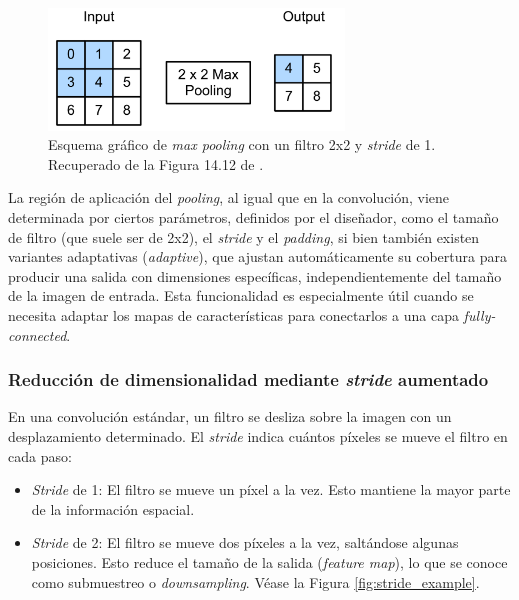 \begin{figure}[h]
    \centering
    \includegraphics[width=0.7\textwidth]{capitulos/cap_02/imagenes/max_pooling.png}
    \caption{
        Esquema gráfico de \textit{max pooling} con un filtro 2x2 y \textit{stride} de 1.
        Recuperado de la Figura 14.12 de \cite{murphy2022}.
    } 
    \label{fig:max_pooling}
\end{figure}

La región de aplicación del \textit{pooling}, al igual que en la convolución, viene determinada por ciertos 
parámetros, definidos por el diseñador, como el tamaño de filtro (que suele ser de 2x2), el \textit{stride} 
y el \textit{padding}, si bien también existen variantes  adaptativas (\textit{adaptive}), que ajustan
automáticamente su cobertura para producir una salida con dimensiones específicas, independientemente del 
tamaño de la imagen de entrada. Esta funcionalidad es especialmente útil cuando se necesita adaptar los mapas
de características para conectarlos a una capa \textit{fully-connected}. 





\subsubsection{Reducción de dimensionalidad mediante \textit{stride} aumentado}

En una convolución estándar, un filtro se desliza sobre la imagen con un desplazamiento determinado. El \textit{stride} indica cuántos píxeles se mueve el filtro en cada paso:

\begin{itemize}
    \item \textit{Stride} de 1: El filtro se mueve un píxel a la vez. Esto mantiene la mayor parte de la información espacial.
    \item \textit{Stride} de 2: El filtro se mueve dos píxeles a la vez, saltándose algunas posiciones. Esto reduce el tamaño de la salida (\textit{feature map}), lo que se conoce como submuestreo o \textit{downsampling}. Véase la Figura \ref{fig:stride_example}.
\end{itemize}

